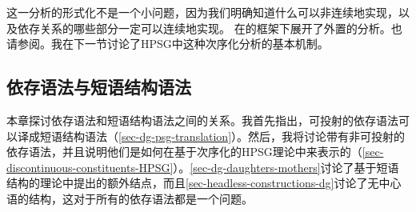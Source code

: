 这一分析的形式化不是一个小问题，因为我们明确知道什么可以非连续地实现，以及依存关系的哪些部分一定可以连续地实现。
\citet{KP95a}在\hpsgc 的框架下展开了外置的分析。也请参阅。我在下一节讨论了HPSG中这种次序化分析的基本机制。

\subsection{依存语法与短语结构语法}
\label{sec-dependency-vs-constituency}

本章探讨依存语法和短语结构语法之间的关系。我首先指出，可投射的依存语法可以译成短语结构语法（\ref{sec-dg-psg-translation}）。然后，我将讨论带有非可投射的依存语法，并且说明他们是如何在基于次序化的HPSG理论中来表示的（\ref{sec-discontinuous-constituents-HPSG}）。\ref{sec-dg-daughters-mothers}讨论了基于短语结构的理论中提出的额外结点，而且\ref{sec-headless-constructions-dg}讨论了无中心语的结构，这对于所有的依存语法都是一个问题。

